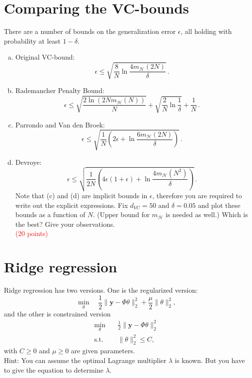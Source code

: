 \documentclass[11pt, nocap, fleqn,a4paper,twoside]{article}
\newcommand{\by}{\mathbf{y}}
\newcommand{\beq}{\begin{equation}}
\newcommand{\eeq}{\end{equation}}
\newcommand{\st}{\text{s.t.}}
\begin{document}
\section{Comparing the VC-bounds}
There are a number of bounds on the generalization error $\epsilon$, all holding with probability at least $1-\delta$.
\begin{enumerate}[(a)]
    \item Original VC-bound:
    \[
    \epsilon \leq \sqrt { \frac { 8 } { N } \ln \frac { 4 m _{\mathcal { H }} ( 2 N ) } { \delta } }\,.
    \]
    \item Rademancher Penalty Bound:
    \[
    \epsilon \leq \sqrt { \frac { 2 \ln ( 2 N m_{\mathcal { H }} ( N ) ) } { N } } + \sqrt { \frac { 2 } { N } \ln \frac { 1 } { \delta } } + \frac { 1 } { N }\,.
    \]
    \item Parrondo and Van den Broek:
\[
\epsilon \leq \sqrt { \frac { 1 } { N } \left( 2 \epsilon + \ln \frac { 6 m_{\mathcal { H }} \left( 2N\right) } { \delta } \right) }\,.
\]
\item Devroye:
\[
\epsilon \leq \sqrt { \frac { 1 } { 2 N } \left( 4 \epsilon ( 1 + \epsilon ) + \ln \frac { 4 m_{\mathcal { H }} \left( N ^ { 2 } \right) } { \delta } \right) }\,.
\]
Note that (c) and (d) are implicit bounds in $\epsilon$, therefore you are required to write out the explicit expressions. Fix $d_{VC} = 50$ and $\delta =0.05$ and plot these bounds as a function of $N$. (Upper bound for $m_{\mathcal{H}}$ is needed as well.) Which is the best? Give your observations. \\
\textcolor{red}{(20 points)}
\end{enumerate}

\section{Ridge regression}
 Ridge regression has two versions.  One is the regularized version:
 \beq\label{ridge.1}
 \min_\theta\quad  \frac{1}{2}\| \by- \Phi \theta\|^2_2 + \frac{\mu}{2}\|\theta\|^2_2,\eeq
 and the other is constrained version
 \beq\label{ridge.2}
 \begin{aligned}
 \min_\theta & \quad \frac{1}{2} \| \by - \Phi \theta\|^2_2\\
 \st & \quad \|\theta\|_2^2 \le C,
 \end{aligned}
 \eeq
 with $C\ge 0$ and $\mu\ge 0$ are given parameters. \\

 Hint: You can assume the optimal Lagrange multiplier $\lambda$ is known. But you have to give the equation to determine $\lambda$.\\
\end{document}
